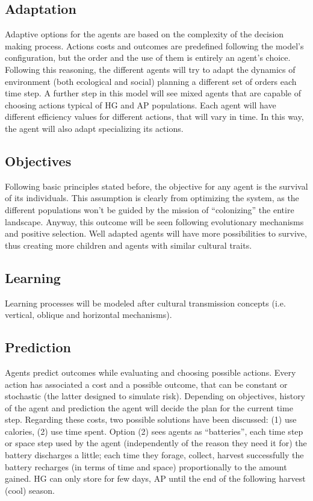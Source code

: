 \subsection{Adaptation}
Adaptive options for the agents are based on the complexity of the decision making process. Actions
costs and outcomes are predefined following the model's configuration, but the order and the use of
them is entirely an agent's choice. Following this reasoning, the different agents will try to adapt the
dynamics of environment (both ecological and social) planning a different set of orders each time step.
A further step in this model will see mixed agents that are capable of choosing actions typical of HG
and AP populations. Each agent will have different efficiency values for different actions, that will vary
in time. In this way, the agent will also adapt specializing its actions.

\subsection{Objectives}
Following basic principles stated before, the objective for any agent is the survival of its individuals.
This assumption is clearly from optimizing the system, as the different populations won't be guided by
the mission of “colonizing” the entire landscape. Anyway, this outcome will be seen following
evolutionary mechanisms and positive selection. Well adapted agents will have more possibilities to
survive, thus creating more children and agents with similar cultural traits.

\subsection{Learning}
Learning processes will be modeled after cultural transmission concepts (i.e. vertical, oblique and
horizontal mechanisms).

\subsection{Prediction}
Agents predict outcomes while evaluating and choosing possible actions. Every action has associated
a cost and a possible outcome, that can be constant or stochastic (the latter designed to simulate
risk). Depending on objectives, history of the agent and prediction the agent will decide the plan for the
current time step.
Regarding these costs, two possible solutions have been discussed: (1) use calories, (2) use time
spent. Option (2) sees agents as “batteries”, each time step or space step used by the agent
(independently of the reason they need it for) the battery discharges a little; each time they forage,
collect, harvest successfully the battery recharges (in terms of time and space) proportionally to the
amount gained. HG can only store for few days, AP until the end of the following harvest (cool)
season.

